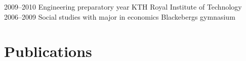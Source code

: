 \documentclass[]{cv-style}          %
\begin{document}
\begin{entrylist}


  \entry
    {2009–2010}
    {Engineering preparatory year}
    {KTH Royal Institute of Technology}
    {}
  \entry
    {2006–2009}
    {Social studies with major in economics}
    {Blackebergs gymnasium}
    {}
\end{entrylist}





\section{Publications}
\end{document}
